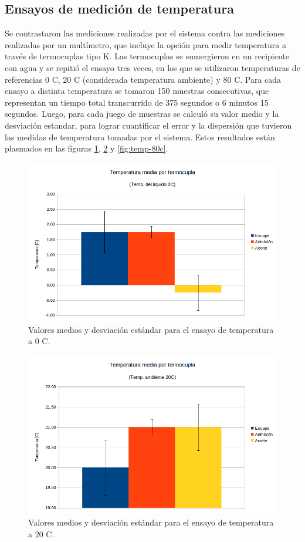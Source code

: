 \subsection{Ensayos de medición de temperatura}

Se contrastaron las mediciones realizadas por el sistema contra las mediciones realizadas por un multímetro, que incluye la opción para medir temperatura a través de termocuplas tipo K. Las termocuplas se sumergieron en un recipiente con agua y se repitió el ensayo tres veces, en los que se utilizaron temperaturas de referencias 0 \degree C, 20 \degree C (considerada temperatura ambiente) y 80 \degree C. Para cada ensayo a distinta temperatura se tomaron 150 muestras consecutivas, que representan un tiempo total transcurrido de 375 segundos o 6 minutos 15 segundos. Luego, para cada juego de muestras se calculó su valor medio y la desviación estandar, para lograr cuantificar el error y la dispersión que tuvieron las medidas de temperatura tomadas por el sistema. Estos resultados están plasmados en las figuras \ref{fig:temp-0c}, \ref{fig:temp-20c} y \ref{fig:temp-80c}.

\begin{figure}[htpb]
\centering
\includegraphics[width=.9\textwidth]{./Figures/temp-0c.png}
\caption{Valores medios y desviación estándar para el ensayo de temperatura a 0 \degree C.}
\label{fig:temp-0c}
\end{figure}

\begin{figure}[htpb]
\centering
\includegraphics[width=.9\textwidth]{./Figures/temp-20c.png}
\caption{Valores medios y desviación estándar para el ensayo de temperatura a 20 \degree C.}
\label{fig:temp-20c}
\end{figure}

